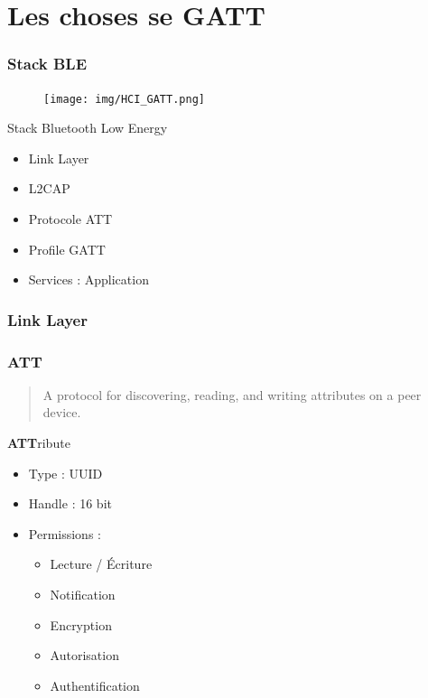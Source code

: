 \section{Les choses se GATT}

\begin{frame}
	\frametitle{Stack BLE}
	\begin{minipage}{0.45\linewidth}
		\begin{figure}
			\texttt{[image: img/HCI\_GATT.png]}
		\end{figure}
	\end{minipage}
	\begin{minipage}{0.50\linewidth}
		\begin{block}{Stack Bluetooth Low Energy}
			\begin{itemize}
				\item Link Layer
				\item L2CAP
				\item Protocole ATT
				\item Profile GATT
				\item Services : Application
			\end{itemize}
		\end{block}
	\end{minipage}
\end{frame}

\begin{frame}
	\frametitle{Link Layer}
\end{frame}

\begin{frame}
	\frametitle{ATT}
	\begin{quote}A protocol for discovering, reading, and writing attributes on a peer device.\end{quote}

	\begin{block}{\textbf{ATT}ribute}
		\begin{itemize}
			\item Type : UUID
			\item Handle : 16 bit
			\item Permissions :
				\begin{itemize}
					\item Lecture / Écriture
					\item Notification
					\item Encryption
					\item Autorisation
					\item Authentification
				\end{itemize}
		\end{itemize}
	\end{block}
\end{frame}

